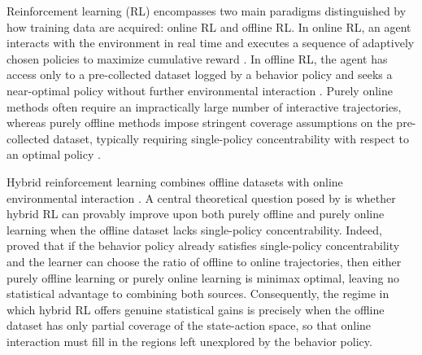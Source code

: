 \begin{aigenblock}

Reinforcement learning (RL) encompasses two main paradigms distinguished by how training data are acquired: online RL and offline RL. In online RL, an agent interacts with the environment in real time and executes a sequence of adaptively chosen policies to maximize cumulative reward \citep{sutton1998, azar2017minimax, jin2018q, zhang2023settling}. In offline RL, the agent has access only to a pre-collected dataset logged by a behavior policy and seeks a near-optimal policy without further environmental interaction \citep{lange2012batch, levine2020offline, jin2021pessimism, li2024settling}. Purely online methods often require an impractically large number of interactive trajectories, whereas purely offline methods impose stringent coverage assumptions on the pre-collected dataset, typically requiring single-policy concentrability with respect to an optimal policy \citep{rashidinejad2021bridging, zhan2022offline, xie2021bellman}.

Hybrid reinforcement learning combines offline datasets with online environmental interaction \citep{vecerik2017leveraging, nair2020awac, xie2022policy, song2023hybrid, nakamoto2023calql, wagenmaker2023leveraging, li2023reward, ball2023efficient, zhou2023offline, amortila2024harnessing}. A central theoretical question posed by \citet{xie2022policy} is whether hybrid RL can provably improve upon both purely offline and purely online learning when the offline dataset lacks single-policy concentrability. Indeed, \citet{xie2022policy} proved that if the behavior policy already satisfies single-policy concentrability and the learner can choose the ratio of offline to online trajectories, then either purely offline learning or purely online learning is minimax optimal, leaving no statistical advantage to combining both sources. Consequently, the regime in which hybrid RL offers genuine statistical gains is precisely when the offline dataset has only partial coverage of the state-action space, so that online interaction must fill in the regions left unexplored by the behavior policy.


\end{aigenblock}
